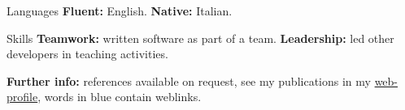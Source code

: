 
\begin{cvskills}

\cvskill
{Languages}
{\textbf{Fluent:} English. \textbf{Native:} Italian.}

\cvskill
{Skills}
{\textbf{Teamwork:} written software as part of a team. \textbf{Leadership:} 
led other developers in teaching activities.}

\end{cvskills}

\flushleft
\footnotesize
\item {\color{awesome-red}\textbf{Fur}}{\color{awesome-darknight}\textbf{ther 
info:}} references available on request, see my publications in my 
{\color{myblue}\href{https://www.ncl.ac.uk/engineering/staff/profile/alessandrode-gennaro.html}{web-profile}},
words in {\color{myblue}blue} contain weblinks.